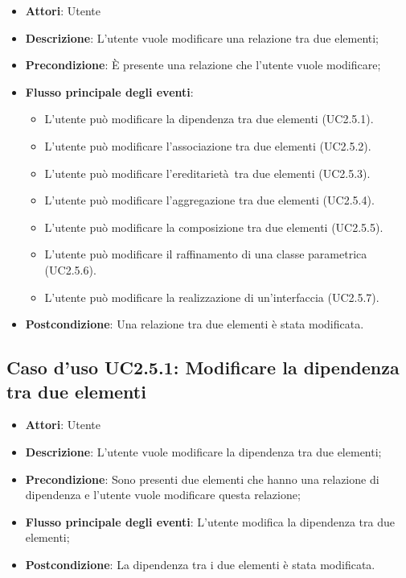 \documentclass[../AnalisiDeiRequisiti.tex]{subfiles}
\begin{document}
		\begin{itemize}
			\item \textbf{Attori}: Utente
			\item \textbf{Descrizione}: L'utente vuole modificare una relazione tra due elementi;
			\item \textbf{Precondizione}: È presente una relazione che l'utente vuole modificare;
			\item \textbf{Flusso principale degli eventi}: \begin{itemize}
				\item L'utente può modificare la dipendenza tra due elementi (UC2.5.1).
				\item L'utente può modificare l'associazione tra due elementi (UC2.5.2).
				\item L'utente può modificare l'ereditarietà tra due elementi (UC2.5.3).
				\item L'utente può modificare l'aggregazione tra due elementi (UC2.5.4).
				\item L'utente può modificare la composizione tra due elementi (UC2.5.5).
				\item L'utente può modificare il raffinamento di una classe parametrica (UC2.5.6).
				\item L'utente può modificare la realizzazione di un'interfaccia (UC2.5.7).
			\end{itemize}
			\item \textbf{Postcondizione}: Una relazione tra due elementi è stata modificata.
		\end{itemize}
		\subsection{Caso d'uso UC2.5.1: Modificare la dipendenza tra due elementi}
		\begin{itemize}
			\item \textbf{Attori}: Utente
			\item \textbf{Descrizione}: L'utente vuole modificare la dipendenza tra due elementi;
			\item \textbf{Precondizione}: Sono presenti due elementi che hanno una relazione di dipendenza e l'utente vuole modificare questa relazione;
			\item \textbf{Flusso principale degli eventi}: L'utente modifica la dipendenza tra due elementi;
			\item \textbf{Postcondizione}: La dipendenza tra i due elementi è stata modificata.
		\end{itemize}
\end{document}
